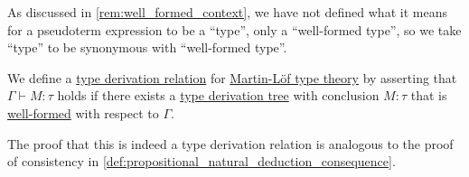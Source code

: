 \begin{comments}
  \item As discussed in \cref{rem:well_formed_context}, we have not defined what it means for a pseudoterm expression to be a \enquote{type}, only a \enquote{well-formed type}, so we take \enquote{type} to be synonymous with \enquote{well-formed type}.
\end{comments}

\begin{definition}\label{def:mltt_derivation}\mimprovised
  We define a \hyperref[def:type_derivation_relation]{type derivation relation} for \hyperref[def:martin_lof_type_theory]{Martin-L\"of type theory} by asserting that \( \Gamma \vdash M: \tau \) holds if there exists a \hyperref[def:type_derivation_tree]{type derivation tree} with conclusion \( M: \tau \) that is \hyperref[def:mltt_well_formed_context/derivation]{well-formed} with respect to \( \Gamma \).
\end{definition}
\begin{comments}
  \item The proof that this is indeed a type derivation relation is analogous to the proof of consistency in \cref{def:propositional_natural_deduction_consequence}.
\end{comments}

